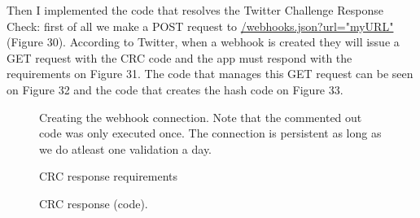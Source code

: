 \documentclass[12pt]{article} %
\begin{document}
\begin{enumerate}
		Then I implemented the code that resolves the Twitter Challenge Response Check: first of all we make a POST request to \url{/webhooks.json?url="myURL"} (Figure 30).
		According to Twitter, when a webhook is created they will issue a GET request with the CRC code and the app must respond with the requirements on Figure 31.
		The code that manages this GET request can be seen on Figure 32 and the code that creates the hash code on Figure 33.
		
		\begin{figure}[H] %
		\caption{Creating the webhook connection. Note that the commented out code was only executed once. The connection is persistent as long as we do atleast one
		validation a day.}
		\label{createWebhook}
		\end{figure}

		\begin{figure}[H] %
		\caption{CRC response requirements}
		\label{CRCrequirements}
		\end{figure}

		\begin{figure}[H] %
		\caption{CRC response (code).}
		\label{CRCresponse}
		\end{figure}


\end{enumerate}
\end{document}
